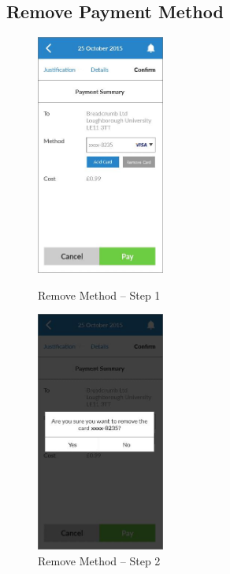 \subsection{Remove Payment Method}

\begin{figure}
  \subfigures
  \centering
  \begin{minipage}{4.6cm}
    \centering
    \includegraphics[width=4.2cm]{inc/ui_payment_rm_step1.jpg}
    \caption{Remove Method -- Step 1}
    \label{fig:ui_payment_rm_step1}
  \end{minipage}
  \begin{minipage}{4.6cm}
    \centering
    \includegraphics[width=4.2cm]{inc/ui_payment_rm_step2.jpg}
    \caption{Remove Method -- Step 2}
    \label{fig:ui_payment_rm_step2}
  \end{minipage}
\end{figure}

